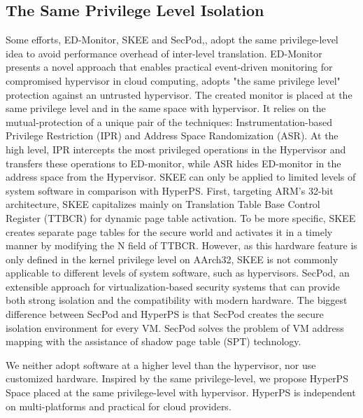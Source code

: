 \subsection{The Same Privilege Level Isolation}
Some efforts, 
ED-Monitor\cite{Deng2017Dancing}, SKEE\cite{azab2016skee} and SecPod\cite{Wang2015SecPod},\cite{Deng2017Dancing}, adopt the same privilege-level idea to avoid performance overhead of inter-level translation.
ED-Monitor presents a novel approach that enables practical event-driven monitoring for compromised hypervisor in cloud computing, adopts "the same privilege level" protection against an untrusted hypervisor. The created monitor is placed at the same privilege level and in the same space with hypervisor. It relies on the mutual-protection of a unique pair of the techniques: Instrumentation-based Privilege Restriction (IPR) and Address Space Randomization (ASR). At the high level, IPR intercepts the most privileged operations in the Hypervisor and transfers these operations to ED-monitor, while ASR hides ED-monitor in the address space from the Hypervisor.
SKEE can only be applied to limited levels of system software in comparison with HyperPS. First, targeting ARM's 32-bit architecture, SKEE capitalizes mainly on Translation Table Base Control Register (TTBCR) for dynamic page table activation. To be more specific, SKEE creates separate page tables for the secure world and activates it in a timely manner by modifying the N field of TTBCR. However, as this hardware feature is only defined in the kernel privilege level on AArch32, SKEE is not commonly applicable to different levels of system software, such as hypervisors. %
SecPod, an extensible approach for virtualization-based security systems that can provide both strong isolation and the compatibility with modern hardware. The biggest difference between SecPod and HyperPS is that SecPod creates the secure isolation environment for every VM. SecPod solves the problem of VM address mapping with the assistance of shadow page table (SPT) technology.

We neither adopt software at a higher level than the hypervisor, nor use customized hardware. Inspired by the same privilege-level, we propose HyperPS Space placed at the same privilege-level with hypervisor. HyperPS is independent on multi-platforms and practical for cloud providers.

